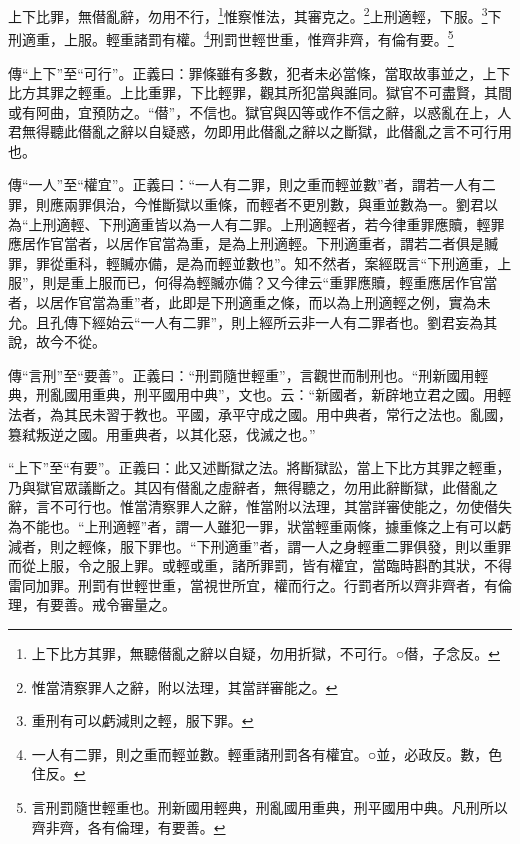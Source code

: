 上下比罪，無僣亂辭，勿用不行，\footnote{上下比方其罪，無聽僣亂之辭以自疑，勿用折獄，不可行。○僣，子念反。}惟察惟法，其審克之。\footnote{惟當清察罪人之辭，附以法理，其當詳審能之。}上刑適輕，下服。\footnote{重刑有可以虧減則之輕，服下罪。}下刑適重，上服。輕重諸罰有權。\footnote{一人有二罪，則之重而輕並數。輕重諸刑罰各有權宜。○並，必政反。數，色住反。}刑罰世輕世重，惟齊非齊，有倫有要。\footnote{言刑罰隨世輕重也。刑新國用輕典，刑亂國用重典，刑平國用中典。凡刑所以齊非齊，各有倫理，有要善。}


{\noindent\zhuan{}\fzbyks 傳“上下”至“可行”。正義曰：罪條雖有多數，犯者未必當條，當取故事並之，上下比方其罪之輕重。上比重罪，下比輕罪，觀其所犯當與誰同。獄官不可盡賢，其間或有阿曲，宜預防之。“僣”，不信也。獄官與囚等或作不信之辭，以惑亂在上，人君無得聽此僣亂之辭以自疑惑，勿即用此僣亂之辭以之斷獄，此僣亂之言不可行用也。 \par}

{\noindent\zhuan{}\fzbyks 傳“一人”至“權宜”。正義曰：“一人有二罪，則之重而輕並數”者，謂若一人有二罪，則應兩罪俱治，今惟斷獄以重條，而輕者不更別數，與重並數為一。劉君以為“上刑適輕、下刑適重皆以為一人有二罪。上刑適輕者，若今律重罪應贖，輕罪應居作官當者，以居作官當為重，是為上刑適輕。下刑適重者，謂若二者俱是贓罪，罪從重科，輕贓亦備，是為而輕並數也”。知不然者，案經既言“下刑適重，上服”，則是重上服而已，何得為輕贓亦備？又今律云“重罪應贖，輕重應居作官當者，以居作官當為重”者，此即是下刑適重之條，而以為上刑適輕之例，實為未允。且孔傳下經始云“一人有二罪”，則上經所云非一人有二罪者也。劉君妄為其說，故今不從。 \par}

{\noindent\zhuan{}\fzbyks 傳“言刑”至“要善”。正義曰：“刑罰隨世輕重”，言觀世而制刑也。“刑新國用輕典，刑亂國用重典，刑平國用中典”，文也。云：“新國者，新辟地立君之國。用輕法者，為其民未習于教也。平國，承平守成之國。用中典者，常行之法也。亂國，篡弒叛逆之國。用重典者，以其化惡，伐滅之也。” \par}

{\noindent\shu{}\fzkt “上下”至“有要”。正義曰：此又述斷獄之法。將斷獄訟，當上下比方其罪之輕重，乃與獄官眾議斷之。其囚有僣亂之虛辭者，無得聽之，勿用此辭斷獄，此僣亂之辭，言不可行也。惟當清察罪人之辭，惟當附以法理，其當詳審使能之，勿使僣失為不能也。“上刑適輕”者，謂一人雖犯一罪，狀當輕重兩條，據重條之上有可以虧減者，則之輕條，服下罪也。“下刑適重”者，謂一人之身輕重二罪俱發，則以重罪而從上服，令之服上罪。或輕或重，諸所罪罰，皆有權宜，當臨時斟酌其狀，不得雷同加罪。刑罰有世輕世重，當視世所宜，權而行之。行罰者所以齊非齊者，有倫理，有要善。戒令審量之。 \par}

